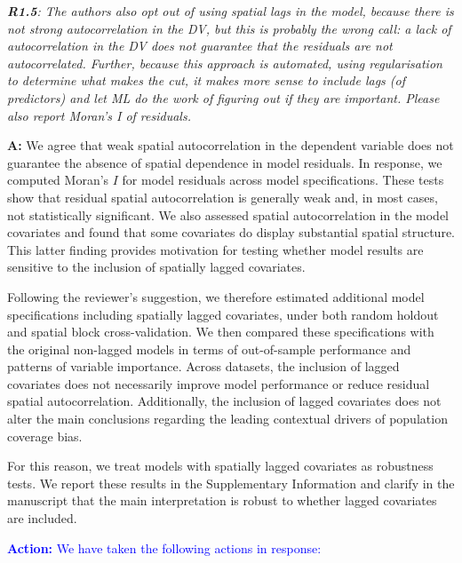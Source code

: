 \documentclass[
  letterpaper,
  DIV=11,
  numbers=noendperiod]{scrartcl}
\begin{document}
\setlength{\leftskip}{0cm}\textit{\textbf{R1.5}: The authors also opt out of using spatial lags in the model, because there is not strong autocorrelation in the DV, but this is probably the wrong call: a lack of autocorrelation in the DV does not guarantee that the residuals are not autocorrelated. Further, because this approach is automated, using regularisation to determine what makes the cut, it makes more sense to include lags (of predictors) and let ML do the work of figuring out if they are important. Please also report Moran’s I of residuals.}

\setlength{\leftskip}{0.5cm}\textbf{A:} We agree that weak spatial
autocorrelation in the dependent variable does not guarantee the absence
of spatial dependence in model residuals. In response, we computed
Moran's \(I\) for model residuals across model specifications. These
tests show that residual spatial autocorrelation is generally weak and,
in most cases, not statistically significant. We also assessed spatial
autocorrelation in the model covariates and found that some covariates
do display substantial spatial structure. This latter finding provides
motivation for testing whether model results are sensitive to the
inclusion of spatially lagged covariates.

Following the reviewer's suggestion, we therefore estimated additional
model specifications including spatially lagged covariates, under both
random holdout and spatial block cross-validation. We then compared
these specifications with the original non-lagged models in terms of
out-of-sample performance and patterns of variable importance. Across
datasets, the inclusion of lagged covariates does not necessarily
improve model performance or reduce residual spatial autocorrelation.
Additionally, the inclusion of lagged covariates does not alter the main
conclusions regarding the leading contextual drivers of population
coverage bias.

For this reason, we treat models with spatially lagged covariates as
robustness tests. We report these results in the Supplementary
Information and clarify in the manuscript that the main interpretation
is robust to whether lagged covariates are included.

\setlength{\leftskip}{0.5cm}\textcolor{blue}{\textbf{Action:} We have taken the following actions in response:}
\vspace{-3mm}
\end{document}
